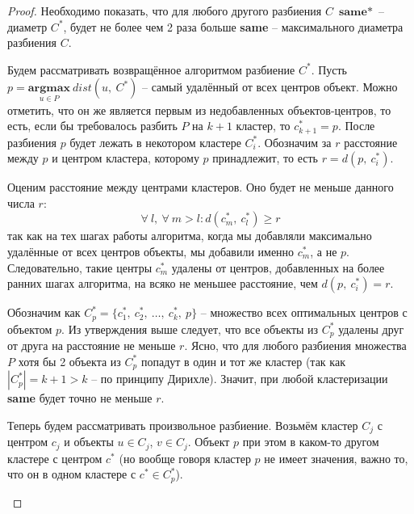 \documentclass[a4paper,12pt]{article}
\begin{document}
\begin{proof}
    Необходимо показать, что для любого другого разбиения $C$ $\textbf{same}*$ -- диаметр $C^*$, будет не более чем 2 раза больше \textbf{same} -- максимального диаметра разбиения $C$.

    Будем рассматривать возвращённое алгоритмом разбиение $C^*$. Пусть $p = \underset{u \in P}{\textbf{argmax}}\ dist(u,\ C^*)$ -- самый удалённый от всех центров объект. Можно отметить, что он же является первым из недобавленных объектов-центров, то есть, если бы требовалось разбить $P$ на $k+1$ кластер, то $c^*_{k + 1} = p$. После разбиения $p$ будет лежать в некотором кластере $C^*_i$. Обозначим за $r$ расстояние между $p$ и центром кластера, которому $p$ принадлежит, то есть $r = d(p,\ c^*_i)$. 
    
    Оценим расстояние между центрами кластеров. Оно будет не меньше данного числа $r$:
    \[\forall\ l,\ \forall\ m > l: d(c^*_m,\ c^*_l) \geqslant r\]так как на тех шагах работы алгоритма, когда мы добавляли максимально удалённые от всех центров объекты, мы добавили именно $c^*_m$, а не $p$. Следовательно, такие центры $c^*_m$ удалены от центров, добавленных на более ранних шагах алгоритма, на всяко не меньшее расстояние, чем $d(p,\ c^*_i) = r$. 
    
    Обозначим как $C^*_p = \{c^*_1,\ c^*_2,\ \ldots,\ c^*_k,\ p\}$ -- множество всех оптимальных центров с объектом $p$. Из утверждения выше следует, что все объекты из $C^*_p$ удалены друг от друга на расстояние не меньше $r$. Ясно, что для любого разбиения множества $P$ хотя бы 2 объекта из $C^*_p$ попадут в один и тот же кластер (так как $|C^*_p| = k + 1 > k$ -- по принципу Дирихле). Значит,  при любой кластеризации \textbf{same} будет точно не меньше $r$.
    
    Теперь будем рассматривать произвольное разбиение. Возьмём кластер $C_j$ с центром $c_j$ и объекты $u \in C_j$, $v \in C_j$. Объект $p$ при этом в каком-то другом кластере с центром $c^*$ (но вообще говоря кластер $p$ не имеет значения, важно то, что он в одном кластере с $c^* \in C^*_p$).
    
    \begin{center}
\end{center}
\end{proof}
\end{document}
